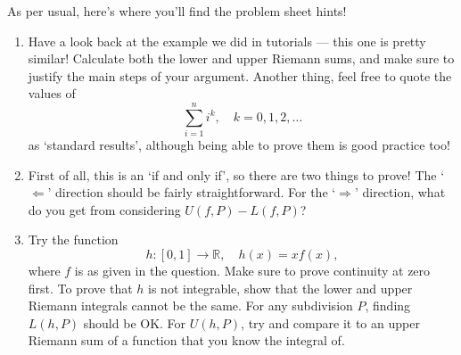 \documentclass[
  12pt,
  a4paper]{extarticle}
\providecommand{\tightlist}{%
  \setlength{\itemsep}{0pt}\setlength{\parskip}{0pt}}
\theoremstyle{plain}
\theoremstyle{definition}
\theoremstyle{plain}
\theoremstyle{plain}
\theoremstyle{plain}
\theoremstyle{plain}
\theoremstyle{definition}
\theoremstyle{definition}
\theoremstyle{remark}
\theoremstyle{remark}
\renewcommand{\;}{\,}
\begin{document}
As per usual, here's where you'll find the problem sheet hints!

\begin{enumerate}
\def\labelenumi{\arabic{enumi})}
\tightlist
\item
  Have a look back at the example we did in tutorials --- this one is pretty similar! Calculate both the lower and upper Riemann sums, and make sure to justify the main steps of your argument. Another thing, feel free to quote the values of \[\sum_{i=1}^{n} i^{k}, \quad k=0,1,2,\ldots\] as `standard results', although being able to prove them is good practice too!
\item
  First of all, this is an `if and only if', so there are two things to prove! The `\(\Leftarrow\)' direction should be fairly straightforward. For the `\(\Rightarrow\)' direction, what do you get from considering \(U(f,P) - L(f,P)\)?
\item
  Try the function \[h:[0,1] \to \mathbb{R}, \quad h(x) = xf(x),\] where \(f\) is as given in the question. Make sure to prove continuity at zero first. To prove that \(h\) is not integrable, show that the lower and upper Riemann integrals cannot be the same. For any subdivision \(P\), finding \(L(h,P)\) should be OK. For \(U(h,P)\), try and compare it to an upper Riemann sum of a function that you know the integral of.
\end{enumerate}
\end{document}
